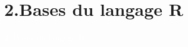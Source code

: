\documentclass[11pt]{beamer}\usepackage[]{graphicx}\usepackage[]{color}
\makeatletter
\newcommand{\hlnum}[1]{\textcolor[rgb]{0.063,0.58,0.627}{#1}}%
\newcommand{\hlstr}[1]{\textcolor[rgb]{0.063,0.58,0.627}{#1}}%
\newcommand{\hlcom}[1]{\textcolor[rgb]{0.588,0.588,0.588}{#1}}%
\newcommand{\hlopt}[1]{\textcolor[rgb]{0.196,0.196,0.196}{#1}}%
\newcommand{\hlstd}[1]{\textcolor[rgb]{0.196,0.196,0.196}{#1}}%
\newcommand{\hlkwb}[1]{\textcolor[rgb]{0.627,0,0.314}{#1}}%
\newcommand{\hlkwc}[1]{\textcolor[rgb]{0,0.631,0.314}{#1}}%
\newcommand{\hlkwd}[1]{\textcolor[rgb]{0.78,0.227,0.412}{#1}}%
\newenvironment{kframe}{%
 \def\at@end@of@kframe{}%
 \ifinner\ifhmode%
  \def\at@end@of@kframe{\end{minipage}}%
  \begin{minipage}{\columnwidth}%
 \fi\fi%
 \def\FrameCommand##1{\hskip\@totalleftmargin \hskip-\fboxsep
 \colorbox{shadecolor}{##1}\hskip-\fboxsep
     \hskip-\linewidth \hskip-\@totalleftmargin \hskip\columnwidth}%
 \MakeFramed {\advance\hsize-\width
   \@totalleftmargin\z@ \linewidth\hsize
   \@setminipage}}%
 {\par\unskip\endMakeFramed%
 \at@end@of@kframe}
\newenvironment{knitrout}{}{} %
\newtheorem{rcode}{R Code}[section]
\makeatother
\begin{document}

\endgroup



\section{2.Bases du langage R}

\begin{frame}[plain]
\hspace*{-1.0cm}\parbox[t]{\textwidth}{
 \begin{center}
  \Huge{\textcolor{white}{2. Bases du langage R}}
 \end{center}
 }
\end{frame}
\end{document}
